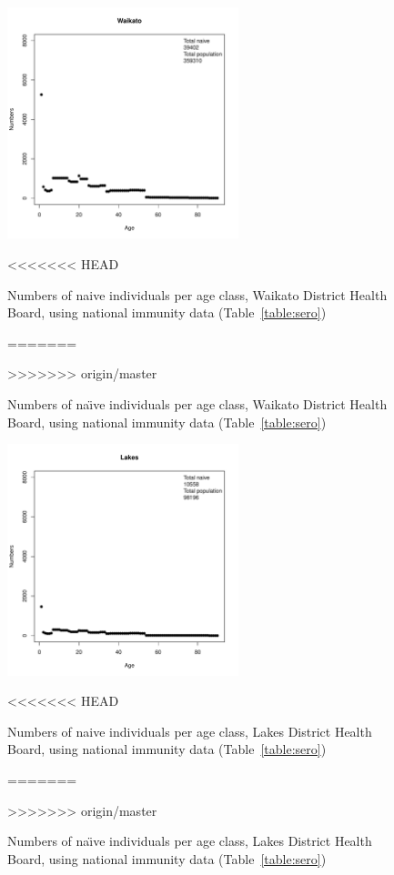 \documentclass{article}
\begin{document}
\begin{itemize}
\begin{figure}[H]
     \begin{center}
     \includegraphics[width=0.6\textwidth]{dhb5.pdf}
     \end{center}
<<<<<<< HEAD
     \caption{Numbers of naive individuals per age class, Waikato District Health Board, using national immunity data (Table~\ref{table:sero})}
=======
     \caption{Numbers of na\"{\i}ve individuals per age class, Waikato District Health Board, using national immunity data (Table~\ref{table:sero})}
>>>>>>> origin/master
     \label{fig:Waikato}
\end{figure}

\begin{figure}[H]
     \begin{center}
     \includegraphics[width=0.6\textwidth]{dhb6.pdf}
     \end{center}
<<<<<<< HEAD
     \caption{Numbers of naive individuals per age class, Lakes District Health Board, using national immunity data (Table~\ref{table:sero})}
=======
     \caption{Numbers of na\"{\i}ve individuals per age class, Lakes District Health Board, using national immunity data (Table~\ref{table:sero})}
>>>>>>> origin/master
     \label{fig:Lakes}
\end{figure}


\end{itemize}
\end{document}
